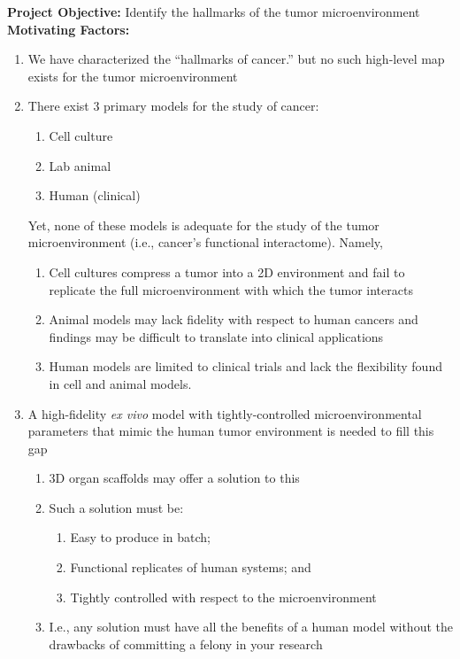 \documentclass[11pt,letterpaper,final] {article}
\begin{document}

{\bfseries Project Objective:} Identify the hallmarks of the tumor microenvironment\\[0.2cm]

{\bfseries Motivating Factors:}
\begin{enumerate}
	\item We have characterized the ``hallmarks of cancer.'' but no such high-level map exists for the tumor microenvironment
	\item There exist 3 primary models for the study of cancer:
		\begin{enumerate}
			\item Cell culture
			\item Lab animal
			\item Human (clinical)
		\end{enumerate}
	Yet, none of these models is adequate for the study of the tumor microenvironment (i.e., cancer's functional interactome). Namely,
		\begin{enumerate}
			\item Cell cultures compress a tumor into a 2D environment and fail to replicate the full microenvironment with which the tumor interacts
			\item Animal models may lack fidelity with respect to human cancers and findings may be difficult to translate into clinical applications
			\item Human models are limited to clinical trials and lack the flexibility found in cell and animal models.
		\end{enumerate}
	\item A high-fidelity {\itshape ex vivo} model with tightly-controlled microenvironmental parameters that mimic the human tumor environment is needed to fill this gap
		\begin{enumerate}
			\item 3D organ scaffolds may offer a solution to this
			\item Such a solution must be:
				\begin{enumerate}
					\item Easy to produce in batch;
					\item Functional replicates of human systems; and
					\item Tightly controlled with respect to the microenvironment
				\end{enumerate}
			\item I.e., any solution must have all the benefits of a human model without the drawbacks of committing a felony in your research
		\end{enumerate}
\end{enumerate}
\end{document}
